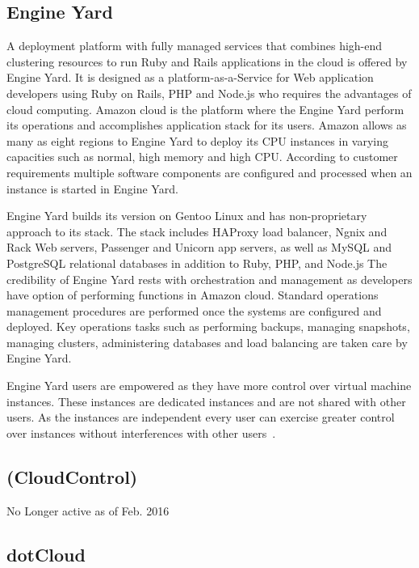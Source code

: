 \subsection{Engine Yard}

    A deployment platform with fully managed services that combines
    high-end clustering resources to run Ruby and Rails applications
    in the cloud is offered by Engine Yard. It is designed as a
    platform-as-a-Service for Web application developers using Ruby on
    Rails, PHP and Node.js who requires the advantages of cloud
    computing. Amazon cloud is the platform where the Engine Yard
    perform its operations and accomplishes application stack for its
    users. Amazon allows as many as eight regions to Engine Yard to
    deploy its CPU instances in varying capacities such as normal,
    high memory and high CPU. According to customer requirements
    multiple software components are configured and processed when an
    instance is started in Engine Yard.
    
    Engine Yard builds its version on Gentoo Linux and has
    non-proprietary approach to its stack. The stack includes HAProxy
    load balancer, Ngnix and Rack Web servers, Passenger and Unicorn
    app servers, as well as MySQL and PostgreSQL relational databases
    in addition to Ruby, PHP, and Node.js The credibility of Engine
    Yard rests with orchestration and management as developers have
    option of performing functions in Amazon cloud. Standard
    operations management procedures are performed once the systems
    are configured and deployed. Key operations tasks such as
    performing backups, managing snapshots, managing clusters,
    administering databases and load balancing are taken care by
    Engine Yard.
    
    Engine Yard users are empowered as they have more control over
    virtual machine instances. These instances are dedicated instances
    and are not shared with other users. As the instances are
    independent every user can exercise greater control over instances
    without interferences with other users~\cite{www-engineyard}.


\pv

\subsection{ (CloudControl)}

No Longer active as of Feb. 2016~\cite{www-wiki}

\subsection{dotCloud}

